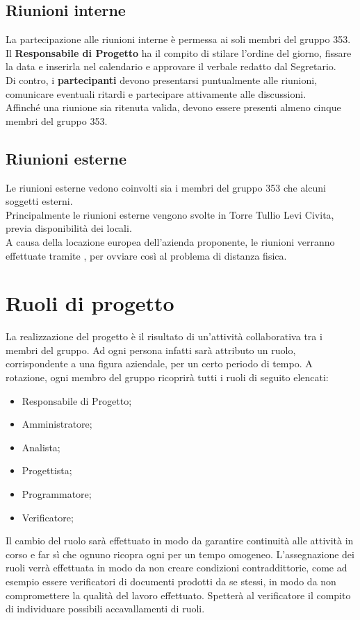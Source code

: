 \documentclass[NormeDiProgetto.tex]{subfiles}
\begin{document}
	\subsection{Riunioni interne}
	La partecipazione alle riunioni interne è permessa ai soli membri del gruppo 353.
	Il \textbf{Responsabile di Progetto} ha il compito di stilare l'ordine del giorno, fissare la data e inserirla nel calendario e approvare il verbale redatto dal Segretario.\\
	Di contro, i \textbf{partecipanti} devono presentarsi puntualmente alle riunioni, comunicare eventuali ritardi e partecipare attivamente alle discussioni.\\
	Affinché una riunione sia ritenuta valida, devono essere presenti almeno cinque membri del gruppo 353.
	\subsection{Riunioni esterne}
	Le riunioni esterne vedono coinvolti sia i membri del gruppo 353 che alcuni soggetti esterni.\\
	Principalmente le riunioni esterne vengono svolte in Torre Tullio Levi Civita, previa disponibilità dei locali.\\
	A causa della locazione europea dell'azienda proponente, le riunioni verranno effettuate tramite , per ovviare così al problema di distanza fisica.
	
	\section{Ruoli di progetto}
	La realizzazione del progetto è il risultato di un'attività collaborativa tra i membri del gruppo. Ad ogni persona infatti sarà attributo un ruolo, corrispondente a una figura aziendale, per un certo periodo di tempo. A rotazione, ogni membro del gruppo ricoprirà tutti i ruoli di seguito elencati:
	\begin{itemize}
		\item Responsabile di Progetto;
		\item Amministratore;
		\item Analista;
		\item Progettista;
		\item Programmatore;
		\item Verificatore;
	\end{itemize}
	Il cambio del ruolo sarà effettuato in modo da garantire continuità alle attività in corso e far sì che ognuno ricopra ogni per un tempo omogeneo. L'assegnazione dei ruoli verrà effettuata in modo da non creare condizioni contraddittorie, come ad esempio essere verificatori di documenti prodotti da se stessi, in modo da non compromettere la qualità del lavoro effettuato.
	Spetterà al verificatore il compito di individuare possibili accavallamenti di ruoli.  
\end{document}
